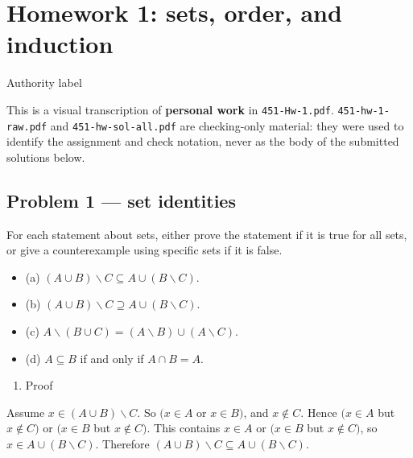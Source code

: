 \chapter{Homework 1: sets, order, and induction}

\begin{qlremark}{Authority label}

This is a visual transcription of \textbf{personal work} in \texttt{451-Hw-1.pdf}. \texttt{451-hw-1-raw.pdf} and \texttt{451-hw-sol-all.pdf} are checking-only material: they were used to identify the assignment and check notation, never as the body of the submitted solutions below.

\end{qlremark}

\section{Problem 1 --- set identities}

For each statement about sets, either prove the statement if it is true for all sets, or give a counterexample using specific sets if it is false.

\begin{itemize}
\tightlist
\item
  (a) \(\left( {A \cup B} \right) \smallsetminus C \subseteq A \cup \left( {B \smallsetminus C} \right)\).
\item
  (b) \(\left( {A \cup B} \right) \smallsetminus C \supseteq A \cup \left( {B \smallsetminus C} \right)\).
\item
  (c) \(A \smallsetminus \left( {B \cup C} \right) = \left( {A \smallsetminus B} \right) \cup \left( {A \smallsetminus C} \right)\).
\item
  (d) \(A \subseteq B\) if and only if \(A \cap B = A\).
\end{itemize}

\begin{qlsolution}{\begin{enumerate}
\def\labelenumi{(\alph{enumi})}
\tightlist
\item
  Proof
\end{enumerate}}

Assume \(x \in \left( {A \cup B} \right) \smallsetminus C\). So \((x \in A\) or \(x \in B)\), and \(x \notin C\). Hence \((x \in A\) but \(x \notin C)\) or \((x \in B\) but \(x \notin C)\). This contains \(x \in A\) or \((x \in B\) but \(x \notin C)\), so \(x \in A \cup \left( {B \smallsetminus C} \right)\). Therefore \(\left( {A \cup B} \right) \smallsetminus C \subseteq A \cup \left( {B \smallsetminus C} \right)\).

\end{qlsolution}

